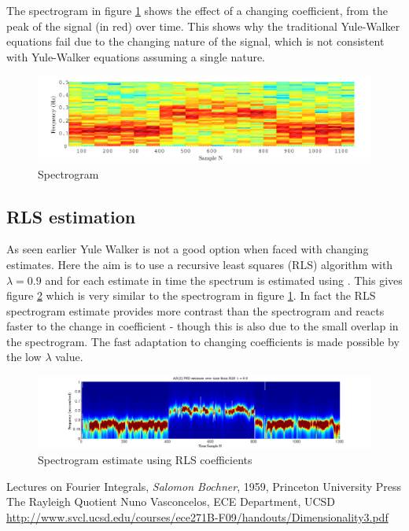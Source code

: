 \documentclass[10pt,twoside,a4paper]{report}
\begin{document}
The spectrogram in figure \ref{fig:4_3a2} shows the effect of a changing coefficient, from the peak of the signal (in red) over time. This shows why the traditional Yule-Walker equations fail due to the changing nature of the signal, which is not consistent with Yule-Walker equations assuming a single nature.
\begin{figure}[h]
\centering
\includegraphics[width=1.0\textwidth]{cw4im/3a_2.pdf}
\caption{Spectrogram}
\label{fig:4_3a2}
\end{figure}

\FloatBarrier

\subsection{RLS estimation}
As seen earlier Yule Walker is not a good option when faced with changing estimates. Here  the aim is to use a recursive least squares (RLS) algorithm with $\lambda = 0.9$ and for each estimate in time the spectrum is estimated using . This gives figure \ref{fig:4_3b} which is very similar to the spectrogram in figure \ref{fig:4_3a2}. In fact the RLS spectrogram estimate provides more contrast than the spectrogram and reacts faster to the change in coefficient - though this is also due to the small overlap in the spectrogram. The fast adaptation to changing coefficients is made possible by the low $\lambda$ value.
\begin{figure}[h]
\centering
\includegraphics[width=1.0\textwidth]{cw4im/4b_RLS.png}
\caption{Spectrogram estimate using RLS coefficients}
\label{fig:4_3b}
\end{figure}


\newpage



\begin{thebibliography}{3}
 Lectures on Fourier Integrals, \textit{Salomon Bochner}, 1959, Princeton University Press
 The Rayleigh Quotient Nuno Vasconcelos, ECE Department, UCSD \url{http://www.svcl.ucsd.edu/courses/ece271B-F09/handouts/Dimensionality3.pdf}
\end{thebibliography}
\endgroup
\end{document}
